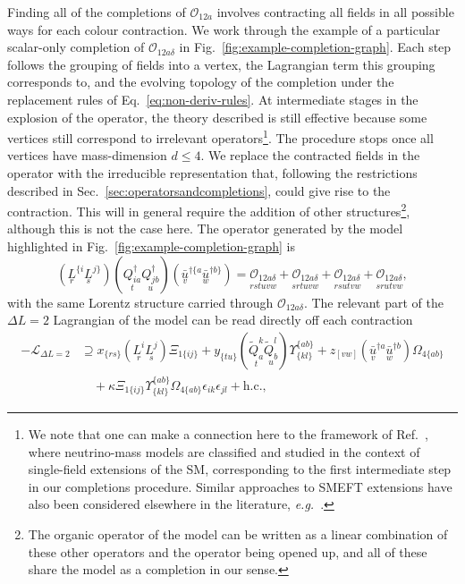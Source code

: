 Finding all of the completions of $\mathcal{O}_{12a}$ involves contracting all
fields in all possible ways for each colour contraction. We work through the
example of a particular scalar-only completion of $\mathcal{O}_{12a\delta}$ in
Fig.~\ref{fig:example-completion-graph}. Each step follows the grouping of
fields into a vertex, the Lagrangian term this grouping corresponds to, and the
evolving topology of the completion under the replacement rules of
Eq.~\eqref{eq:non-deriv-rules}. At intermediate stages in the explosion of the
operator, the theory described is still effective because some vertices still
correspond to irrelevant operators\footnote{We note that one can make a
  connection here to the framework of Ref.~\cite{Herrero-Garcia:2019czj}, where
  neutrino-mass models are classified and studied in the context of single-field
  extensions of the SM, corresponding to the first intermediate step in our
  completions procedure. Similar approaches to SMEFT extensions have also been
  considered elsewhere in the literature,
  \textit{e.g.}~\cite{Banerjee:2020jun}.}. The procedure stops once all vertices
have mass-dimension $d \leq 4$. We replace the contracted fields in the operator
with the irreducible representation that, following the restrictions described
in Sec.~\ref{sec:operatorsandcompletions}, could give rise to the contraction.
This will in general require the addition of other structures\footnote{The
  organic operator of the model can be written as a linear combination of these
  other operators and the operator being opened up, and all of these share the
  model as a completion in our sense.}, although this is not the case here. The
operator generated by the model highlighted in
Fig.~\ref{fig:example-completion-graph} is
\begin{equation}
  (\underset{r}{L}^{\{i}\underset{s}{L}^{j\}})(\underset{t}{Q^{\dagger}_{i a}} \underset{u}{Q^{\dagger}_{j b}})(\underset{v}{\bar{u}}^{\dagger \{a} \underset{w}{\bar{u}}^{\dagger b\}}) = \underset{rstuvw}{\mathcal{O}_{12a\delta}} + \underset{srtuvw}{\mathcal{O}_{12a\delta}} + \underset{rsutvw}{\mathcal{O}_{12a\delta}} + \underset{srutvw}{\mathcal{O}_{12a\delta}},
\end{equation}
with the same Lorentz structure carried through $\mathcal{O}_{12a\delta}$. The
relevant part of the $\Delta L = 2$ Lagrangian of the model can be read directly off each contraction
\begin{equation}
  \begin{split}
    - \mathscr{L}_{\Delta L = 2} &\supseteq x_{\{rs\}} (\underset{r}{L^{i}} \underset{s}{L^{j}}) \Xi_{1 \{ij\}} + y_{\{tu\}}(\underset{t}{\tilde{Q}_{a}^{k}} \underset{u}{\tilde{Q}_{b}^{l}}) \Upsilon_{\{kl\}}^{\{ab\}} + z_{[vw]}(\underset{v}{\bar{u}}^{\dagger a} \underset{w}{\bar{u}}^{\dagger b}) \Omega_{4 \{ab\}}\\
    &\quad + \kappa \Xi_{1 \{ij\}} \Upsilon^{\{ab\}}_{\{kl\}} \Omega_{4 \{a b\}} \epsilon_{ik} \epsilon_{jl} + \text{h.c.},
  \end{split}
\end{equation}
